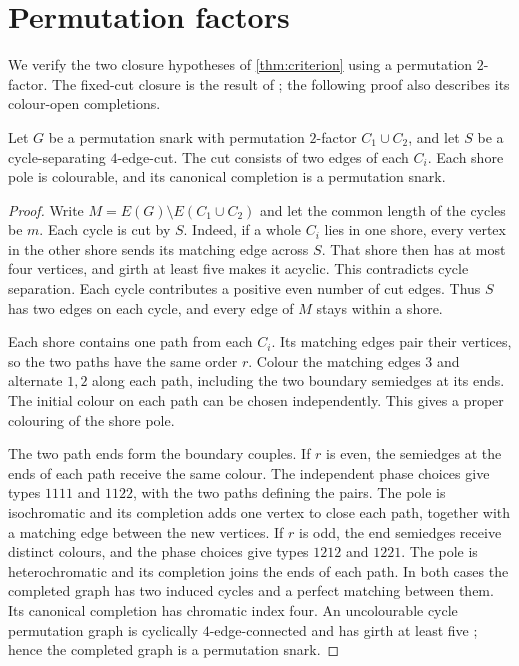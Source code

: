 \documentclass[justified,notoc,twoside,nobib,nofonts]{tufte-handout}
\begin{document}
\section{Permutation factors}\label{sec:permutation}

We verify the two closure hypotheses of \cref{thm:criterion} using
a permutation $2$-factor. The fixed-cut closure is the result of
\citep[Section~2]{MS19}; the following proof also describes its
colour-open completions.

\begin{lemma}\label{lem:permutation-cut}
Let $G$ be a permutation snark with permutation $2$-factor
$C_1\cup C_2$, and let $S$ be a cycle-separating $4$-edge-cut.
The cut consists of two edges of each $C_i$. Each shore pole is
colourable, and its canonical completion is a permutation snark.
\end{lemma}
\begin{proof}
Write $M=E(G)\setminus E(C_1\cup C_2)$ and let the common length of
the cycles be $m$. Each cycle is cut by $S$.
Indeed, if a whole $C_i$ lies in one shore, every vertex in the
other shore sends its matching edge across $S$. That shore then
has at most four vertices, and girth at least five makes it
acyclic. This contradicts cycle separation.
Each cycle contributes a positive even number of cut edges.
Thus $S$ has two edges on each cycle, and every edge of $M$ stays
within a shore.

Each shore contains one path from each $C_i$. Its matching edges
pair their vertices, so the two paths have the same order $r$.
Colour the matching edges $3$ and alternate $1,2$ along each path,
including the two boundary semiedges at its ends.
The initial colour on each path can be chosen independently.
This gives a proper colouring of the shore pole.

The two path ends form the boundary couples. If $r$ is even, the
semiedges at the ends of each path receive the same colour.
The independent phase choices give types $1111$ and $1122$, with
the two paths defining the pairs. The pole is isochromatic and its
completion adds one vertex to close each path, together with a
matching edge between the new vertices.
If $r$ is odd, the end semiedges receive distinct colours, and the
phase choices give types $1212$ and $1221$. The pole is
heterochromatic and its completion joins the ends of each path.
In both cases the completed graph has two induced cycles and a
perfect matching between them. Its canonical completion has
chromatic index four. An uncolourable cycle permutation graph is
cyclically $4$-edge-connected and has girth at least five
\citep[Section~1]{MS19}; hence the completed graph is a permutation
snark.
\end{proof}
\end{document}
